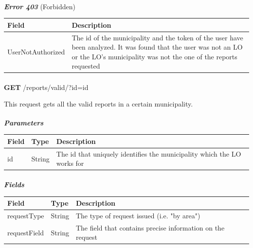 						\paragraph{}
							\textit{\textbf{Error 403}} (Forbidden)
							\vspace{-2mm}
							\begin{table}[!h]
								\begin{tabular}{L{0.4\textwidth}L{0.4\textwidth}}
									\toprule
									\textbf{Field} & \textbf{Description} \\
									\midrule
								  	UserNotAuthorized & The id of the municipality and the token of the user have been analyzed. It was found that the user was not an LO or the LO's municipality was not the one of the reports requested \\
								 	\bottomrule
								\end{tabular}
							\end{table}
							
						\clearpage
						\paragraph{}
						\textbf{GET} /reports/valid/?id={id}
						
						This request gets all the valid reports in a certain municipality.
						\paragraph{}
							\textit{\textbf{Parameters}}
							\vspace{-2mm}
							\begin{table}[!h]
								\begin{tabular}{L{0.2\textwidth}L{0.2\textwidth}L{0.4\textwidth}}
									\toprule
									\textbf{Field} & \textbf{Type} & \textbf{Description} \\
									\midrule
								 	id & String & The id that uniquely identifies the municipality which the LO works for \\
								 	\bottomrule
								\end{tabular}
							\end{table}
						\vspace{-5mm}
						\paragraph{}
							\textit{\textbf{Fields}}
							\vspace{-2mm}
							\begin{table}[!h]
								\begin{tabular}{L{0.25\textwidth}L{0.15\textwidth}L{0.4\textwidth}}
									\toprule
									\textbf{Field} & \textbf{Type} & \textbf{Description} \\
									\midrule
								 	requestType & String & The type of request issued (i.e. "by area") \\
								 	requestField & String & The field that contains precise information on the request \\
								 	\bottomrule
								\end{tabular}
							\end{table}

